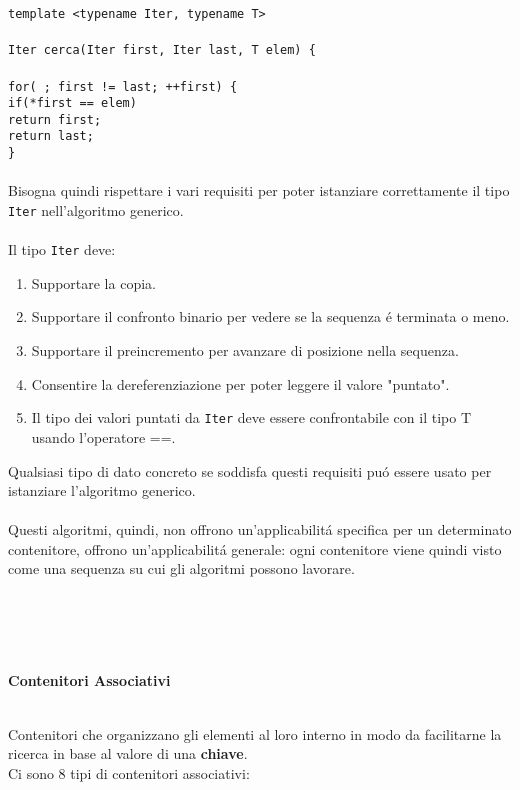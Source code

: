 \documentclass{article}
\newcommand\tab[1][1cm]{\hspace*{#1}}
\begin{document}
\texttt{template <typename Iter, typename T> \\ \\ Iter cerca(Iter first, Iter last, T elem) \{ \\ \\ \tab for( ; first != last; ++first) \{ \\ \tab \tab if(*first == elem) \\ \tab \tab \tab return first; \\ \tab \tab return last; \\ \} }
\\ \\ Bisogna quindi rispettare i vari requisiti per poter istanziare correttamente il tipo \texttt{Iter} nell'algoritmo generico.\\ \\Il tipo \texttt{Iter} deve:\\
\begin{enumerate}
\item Supportare la copia.
\item Supportare il confronto binario per vedere se la sequenza \'e terminata o meno.
\item Supportare il preincremento per avanzare di posizione nella sequenza.
\item Consentire la dereferenziazione per poter leggere il valore "puntato".
\item Il tipo dei valori puntati da \texttt{Iter} deve essere confrontabile con il tipo T usando l'operatore ==.\\
\end{enumerate}
Qualsiasi tipo di dato concreto se soddisfa questi requisiti pu\'o essere usato per istanziare l'algoritmo generico.
\\ \\Questi algoritmi, quindi, non offrono un'applicabilit\'a specifica per un determinato contenitore, offrono un'applicabilit\'a generale: ogni contenitore viene quindi visto come una sequenza su cui gli algoritmi possono lavorare.
\\ \\ \\ \\ \\
\begin{large} \textbf{\textcolor{blu}{Contenitori Associativi}} \\ \\ \end{large}
Contenitori che organizzano gli elementi al loro interno in modo da facilitarne la ricerca in base al valore di una \textbf{chiave}.\\Ci sono 8 tipi di contenitori associativi: \\
\end{document}
